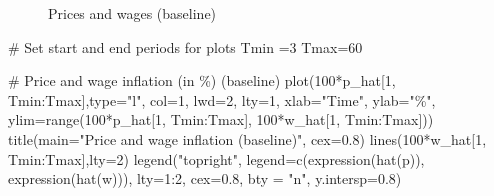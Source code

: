 \documentclass[
  letterpaper,
  DIV=11,
  numbers=noendperiod]{scrreprt}
\newenvironment{Shaded}{\begin{snugshade}}{\end{snugshade}}
\newcommand{\AttributeTok}[1]{\textcolor[rgb]{0.40,0.45,0.13}{#1}}
\newcommand{\CommentTok}[1]{\textcolor[rgb]{0.37,0.37,0.37}{#1}}
\newcommand{\DecValTok}[1]{\textcolor[rgb]{0.68,0.00,0.00}{#1}}
\newcommand{\FloatTok}[1]{\textcolor[rgb]{0.68,0.00,0.00}{#1}}
\newcommand{\FunctionTok}[1]{\textcolor[rgb]{0.28,0.35,0.67}{#1}}
\newcommand{\NormalTok}[1]{\textcolor[rgb]{0.00,0.23,0.31}{#1}}
\newcommand{\OtherTok}[1]{\textcolor[rgb]{0.00,0.23,0.31}{#1}}
\newcommand{\SpecialCharTok}[1]{\textcolor[rgb]{0.37,0.37,0.37}{#1}}
\newcommand{\StringTok}[1]{\textcolor[rgb]{0.13,0.47,0.30}{#1}}
\begin{document}
\begin{figure}[H]


\caption{\label{fig-baseline-prices}Prices and wages (baseline)}

\end{figure}%

\begin{Shaded}
\begin{Highlighting}[]
\CommentTok{\# Set start and end periods for plots}
\NormalTok{Tmin }\OtherTok{=}\DecValTok{3}
\NormalTok{Tmax}\OtherTok{=}\DecValTok{60}

\CommentTok{\# Price and wage inflation (in \%) (baseline)}
\FunctionTok{plot}\NormalTok{(}\DecValTok{100}\SpecialCharTok{*}\NormalTok{p\_hat[}\DecValTok{1}\NormalTok{, Tmin}\SpecialCharTok{:}\NormalTok{Tmax],}\AttributeTok{type=}\StringTok{"l"}\NormalTok{, }\AttributeTok{col=}\DecValTok{1}\NormalTok{, }\AttributeTok{lwd=}\DecValTok{2}\NormalTok{, }\AttributeTok{lty=}\DecValTok{1}\NormalTok{, }\AttributeTok{xlab=}\StringTok{"Time"}\NormalTok{, }\AttributeTok{ylab=}\StringTok{"\%"}\NormalTok{, }\AttributeTok{ylim=}\FunctionTok{range}\NormalTok{(}\DecValTok{100}\SpecialCharTok{*}\NormalTok{p\_hat[}\DecValTok{1}\NormalTok{, Tmin}\SpecialCharTok{:}\NormalTok{Tmax], }\DecValTok{100}\SpecialCharTok{*}\NormalTok{w\_hat[}\DecValTok{1}\NormalTok{, Tmin}\SpecialCharTok{:}\NormalTok{Tmax])) }
\FunctionTok{title}\NormalTok{(}\AttributeTok{main=}\StringTok{"Price and wage inflation (baseline)"}\NormalTok{, }\AttributeTok{cex=}\FloatTok{0.8}\NormalTok{)}
\FunctionTok{lines}\NormalTok{(}\DecValTok{100}\SpecialCharTok{*}\NormalTok{w\_hat[}\DecValTok{1}\NormalTok{, Tmin}\SpecialCharTok{:}\NormalTok{Tmax],}\AttributeTok{lty=}\DecValTok{2}\NormalTok{)}
\FunctionTok{legend}\NormalTok{(}\StringTok{"topright"}\NormalTok{, }\AttributeTok{legend=}\FunctionTok{c}\NormalTok{(}\FunctionTok{expression}\NormalTok{(}\FunctionTok{hat}\NormalTok{(p)), }\FunctionTok{expression}\NormalTok{(}\FunctionTok{hat}\NormalTok{(w))),}
       \AttributeTok{lty=}\DecValTok{1}\SpecialCharTok{:}\DecValTok{2}\NormalTok{, }\AttributeTok{cex=}\FloatTok{0.8}\NormalTok{, }\AttributeTok{bty =} \StringTok{"n"}\NormalTok{, }\AttributeTok{y.intersp=}\FloatTok{0.8}\NormalTok{)}
\end{Highlighting}
\end{Shaded}
\end{document}
